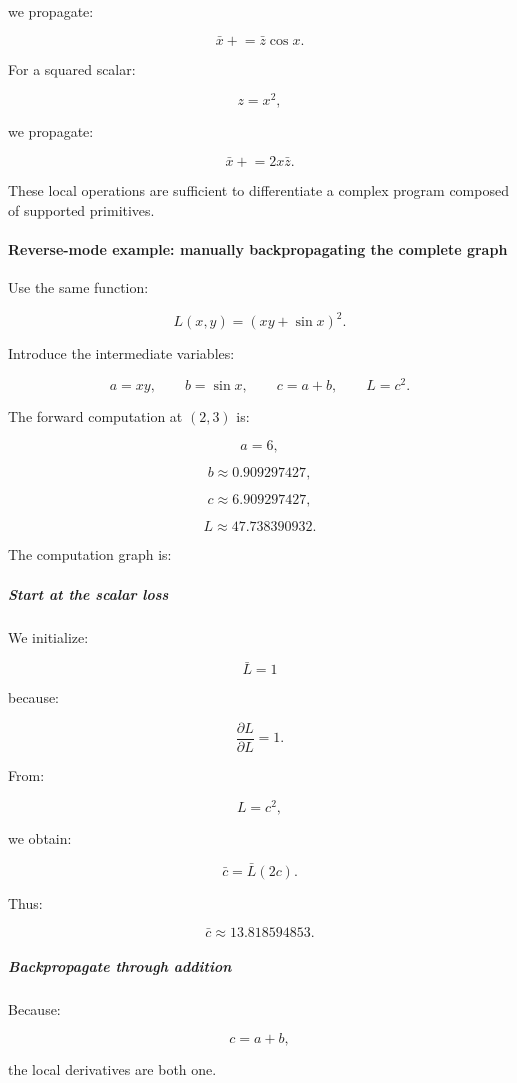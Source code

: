 we propagate:

\[
\boxed{ \bar x\mathrel{+}=\bar z\cos x }.
\]

For a squared scalar:

\[
z=x^2,
\]

we propagate:

\[
\boxed{ \bar x\mathrel{+}=2x\bar z }.
\]

These local operations are sufficient to differentiate a complex program composed of supported primitives.

\paragraph{Reverse-mode example: manually backpropagating the complete graph}\label{reverse-mode-example-manually-backpropagating-the-complete-graph}

Use the same function:

\[
L(x,y)=(xy+\sin x)^2.
\]

Introduce the intermediate variables:

\[
a=xy,\qquad b=\sin x,\qquad c=a+b,\qquad L=c^2.
\]

The forward computation at \((2,3)\) is:

\[
a=6,
\]

\[
b\approx0.909297427,
\]

\[
c\approx6.909297427,
\]

\[
L\approx47.738390932.
\]

The computation graph is:

\subparagraph{Start at the scalar loss}\label{start-at-the-scalar-loss}

We initialize:

\[
\boxed{\bar L=1}
\]

because:

\[
\frac{\partial L}{\partial L}=1.
\]

From:

\[
L=c^2,
\]

we obtain:

\[
\bar c=\bar L(2c).
\]

Thus:

\[
\boxed{\bar c\approx13.818594853}.
\]

\subparagraph{Backpropagate through addition}\label{backpropagate-through-addition}

Because:

\[
c=a+b,
\]

the local derivatives are both one.

